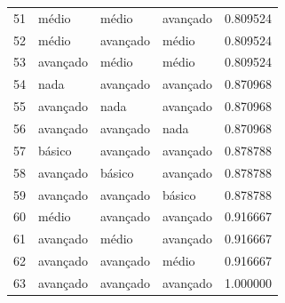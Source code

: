 \documentclass[]{article}
\begin{document}
\begin{longtable}{|llll|r|}
		51 & médio    & médio    & avançado & 0.809524     \\
		52 & médio    & avançado & médio    & 0.809524     \\
		53 & avançado & médio    & médio    & 0.809524     \\
		54 & nada      & avançado & avançado & 0.870968     \\
		55 & avançado & nada      & avançado & 0.870968     \\
		56 & avançado & avançado & nada      & 0.870968     \\
		57 & básico   & avançado & avançado & 0.878788     \\
		58 & avançado & básico   & avançado & 0.878788     \\
		59 & avançado & avançado & básico   & 0.878788     \\
		60 & médio    & avançado & avançado & 0.916667     \\
		61 & avançado & médio    & avançado & 0.916667     \\
		62 & avançado & avançado & médio    & 0.916667     \\
		63 & avançado & avançado & avançado & 1.000000     \\
		\hline
	\end{longtable}
	
	
	
\end{document}

